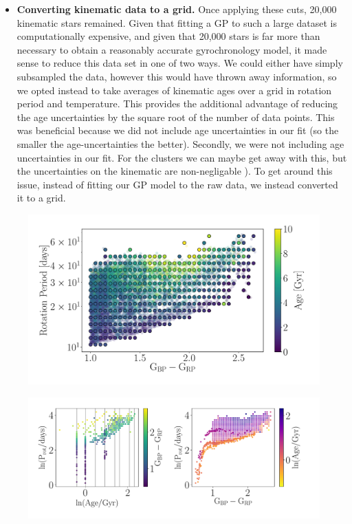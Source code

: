 \begin{itemize}
\item {\bf Converting kinematic data to a grid.}
Once applying these cuts, 20,000 kinematic stars remained.
        Given that fitting a GP to such a large dataset is computationally
        expensive, and given that 20,000 stars is far more than necessary to
        obtain a reasonably accurate gyrochronology model, it made sense to
        reduce this data set in one of two ways.
        We could either have simply subsampled the data, however this would
        have thrown away
        information, so we opted instead to take averages of kinematic ages
        over a grid in rotation period and temperature.
This provides the additional advantage of reducing the age uncertainties by
        the square root of the number of data points.
        This was beneficial because we did not include age uncertainties in
        our fit (so the smaller the age-uncertainties the better).
Secondly, we were not including age uncertainties in our fit.
For the clusters we can maybe get away with this, but the uncertainties on the
kinematic are non-negligable \citep[likely 1-2 Gyr][]{lu2021}).
To get around this issue, instead of fitting our GP model to the raw data, we
instead converted it to a grid.
\end{itemize}

\begin{figure}
\caption{
}
  \centering \includegraphics[width=1\textwidth]{grid_points}
\end{figure}

\begin{figure}
\caption{
}
  \centering \includegraphics[width=1\textwidth]{gp_fit_data_multi-panel}
\end{figure}

